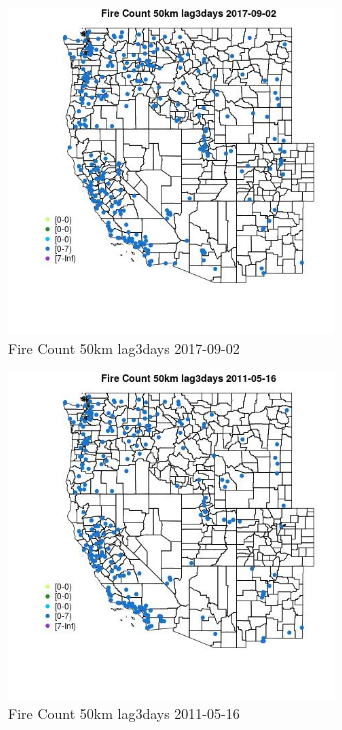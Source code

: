 \begin{figure} 
\centering  
\includegraphics[width=0.77\textwidth]{Code_Outputs/Report_ML_input_PM25_Step4_part_e_de_duplicated_aves_compiled_2019-05-20wNAs_MapObsFire_Count_50km_lag3days2017-09-02.jpg} 
\caption{\label{fig:Report_ML_input_PM25_Step4_part_e_de_duplicated_aves_compiled_2019-05-20wNAsMapObsFire_Count_50km_lag3days2017-09-02}Fire Count 50km lag3days 2017-09-02} 
\end{figure} 
 

\begin{figure} 
\centering  
\includegraphics[width=0.77\textwidth]{Code_Outputs/Report_ML_input_PM25_Step4_part_e_de_duplicated_aves_compiled_2019-05-20wNAs_MapObsFire_Count_50km_lag3days2011-05-16.jpg} 
\caption{\label{fig:Report_ML_input_PM25_Step4_part_e_de_duplicated_aves_compiled_2019-05-20wNAsMapObsFire_Count_50km_lag3days2011-05-16}Fire Count 50km lag3days 2011-05-16} 
\end{figure} 
 

